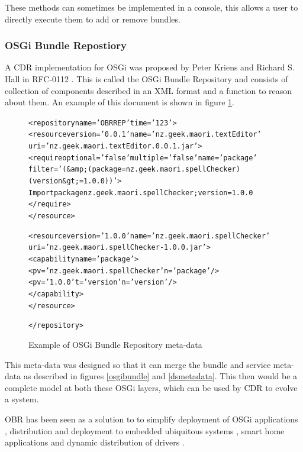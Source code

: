 These methods can sometimes be implemented in a console, this allows a user to directly execute them to add or remove bundles.

\subsubsection{OSGi Bundle Repostiory}
A CDR implementation for OSGi was proposed by Peter Kriens and Richard S. Hall in RFC-0112 \citep{the_osgi_alliance_rfc-0112_2006}.
This is called the OSGi Bundle Repository and consists of collection of components described in an XML format and a function to reason about them.
An example of this document is shown in figure \ref{obrmetadata}.

\begin{figure}[htp]
\begin{center}
\begin{alltt}
<repository name='OBR REP' time='123'> 
  <resource version='0.0.1' name='nz.geek.maori.textEditor' 
  uri='nz.geek.maori.textEditor.0.0.1.jar'> 
    <require optional='false'  multiple='false'  name='package' 
        filter='(&amp;(package=nz.geek.maori.spellChecker)(version&gt;=1.0.0))'> 
      Import package nz.geek.maori.spellChecker ;version=1.0.0 
    </require> 
  </resource> 

  <resource version='1.0.0' name='nz.geek.maori.spellChecker' 
  uri='nz.geek.maori.spellChecker-1.0.0.jar'> 
    <capability name='package'> 
      <p v='nz.geek.maori.spellChecker' n='package'/> 
      <p v='1.0.0' t='version' n='version'/> 
    </capability> 
  </resource> 

</repository>
\end{alltt}
  \caption[OSGi Bundle Repository markup example]{Example of OSGi Bundle Repository meta-data}
  \label{obrmetadata}
\end{center}
\end{figure}

This meta-data was designed so that it can merge the bundle and service meta-data as described in figures \ref{osgibundle} and \ref{dsmetadata}.
This then would be a complete model at both these OSGi layers, which can be used by CDR to evolve a system. 

OBR has been seen as a solution to to simplify deployment of OSGi applications \citep{Jung2007}, 
distribution and deployment to embedded ubiquitous systems \citep{Jung2006}, 
smart home applications \citep{Gouin-Vallerand2007} and 
dynamic distribution of drivers \citep{Kriens2008}. 

